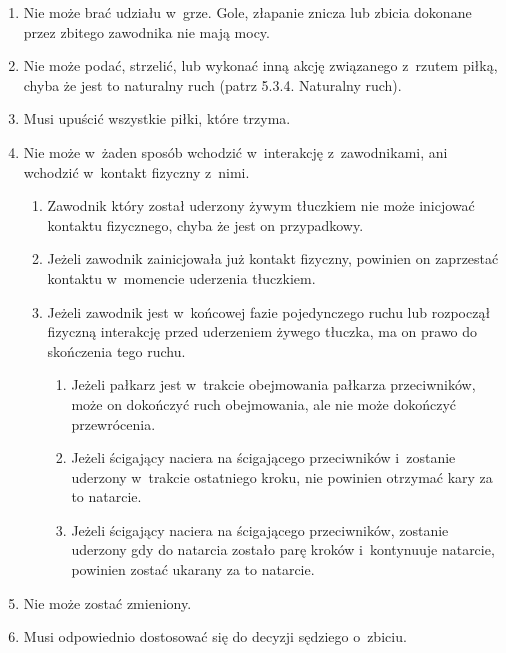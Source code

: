 \documentclass[12pt,a4paper]{article}
\begin{document}
\begin{enumerate}
	\item
	      Nie może brać udziału w~grze. Gole, złapanie znicza lub zbicia
	      dokonane przez zbitego zawodnika nie mają mocy.
	\item
	      Nie może podać, strzelić, lub wykonać inną akcję związanego z~rzutem piłką,
	      chyba że jest to naturalny ruch (patrz 5.3.4. Naturalny ruch).
	\item
	      Musi upuścić wszystkie piłki, które trzyma.
	\item
		Nie może w~żaden sposób wchodzić w~interakcję z~zawodnikami,
		ani wchodzić w~kontakt fizyczny z~nimi.

	      \begin{enumerate}
		      \item
		            Zawodnik który został uderzony żywym tłuczkiem nie może inicjować
		            kontaktu fizycznego, chyba że jest on przypadkowy.
		      \item
		            Jeżeli zawodnik zainicjowała już kontakt fizyczny, powinien on
		            zaprzestać kontaktu w~momencie uderzenia tłuczkiem.
		      \item
		            Jeżeli zawodnik jest w~końcowej fazie pojedynczego ruchu lub
		            rozpoczął fizyczną interakcję przed uderzeniem żywego tłuczka, ma on
		            prawo do skończenia tego ruchu.

		            \begin{enumerate}
			            \item
			                  Jeżeli pałkarz jest w~trakcie obejmowania pałkarza przeciwników,
			                  może on dokończyć ruch obejmowania, ale nie może dokończyć
			                  przewrócenia.
			            \item
			                  Jeżeli ścigający naciera na ścigającego przeciwników i~zostanie
			                  uderzony w~trakcie ostatniego kroku, nie powinien otrzymać kary za
			                  to natarcie.
			            \item
			                  Jeżeli ścigający naciera na ścigającego przeciwników, zostanie
			                  uderzony gdy do natarcia zostało parę kroków i~kontynuuje
			                  natarcie, powinien zostać ukarany za to natarcie.
		            \end{enumerate}
	      \end{enumerate}
	\item
	      Nie może zostać zmieniony.
	\item
	      Musi odpowiednio dostosować się do decyzji sędziego o~zbiciu.
\end{enumerate}
\end{document}
